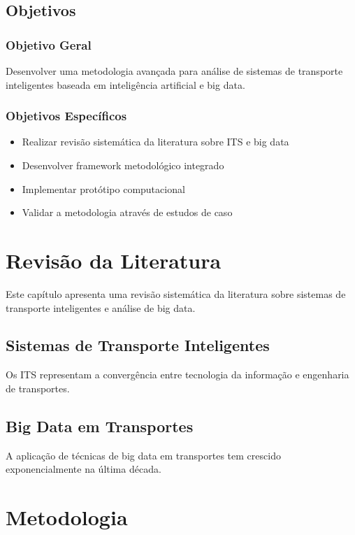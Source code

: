 \documentclass[doutorado,onehalfspacing,12pt,hyperref]{UnB-PPGT}
\begin{document}
\section{Objetivos}
\label{sec:objetivos}

\subsection{Objetivo Geral}
Desenvolver uma metodologia avançada para análise de sistemas de transporte inteligentes baseada em inteligência artificial e big data.

\subsection{Objetivos Específicos}
\begin{itemize}
\item Realizar revisão sistemática da literatura sobre ITS e big data
\item Desenvolver framework metodológico integrado
\item Implementar protótipo computacional
\item Validar a metodologia através de estudos de caso
\end{itemize}

\chapter{Revisão da Literatura}
\label{cap:revisao}

Este capítulo apresenta uma revisão sistemática da literatura sobre sistemas de transporte inteligentes e análise de big data.

\section{Sistemas de Transporte Inteligentes}
\label{sec:its}

Os ITS representam a convergência entre tecnologia da informação e engenharia de transportes.

\section{Big Data em Transportes}
\label{sec:bigdata}

A aplicação de técnicas de big data em transportes tem crescido exponencialmente na última década.

\chapter{Metodologia}
\label{cap:metodologia}
\end{document}
